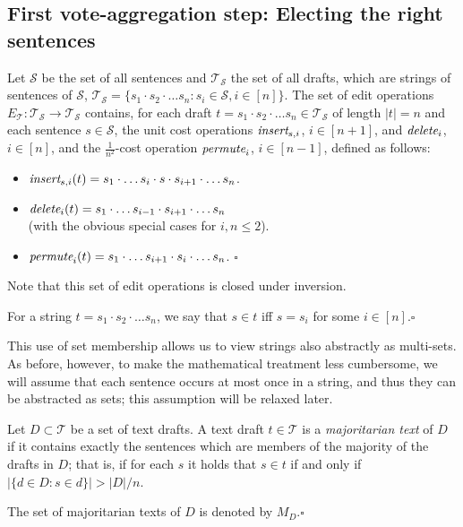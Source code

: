 \documentclass[sigconf]{aamas}  %
\newcommand{\qqed}{\hfill$\square$}
\newcommand{\calS}{\mathcal{S}}
\newcommand{\calT}{\mathcal{T}}
\newcommand{\iinsert}[1]{\emph{insert}_{#1}}
\newcommand{\ddelete}[1]{\emph{delete}_{#1}}
\newcommand{\permute}[1]{\emph{permute}_{#1}}
\begin{document}
\subsection{First vote-aggregation step: Electing the right sentences}

\begin{definition}
Let $\calS$ be the set of all sentences and $\calT_\calS$ the set of all drafts, which are strings of sentences of $\calS$,   
$\calT_\calS = \{s_1\cdot s_2 \cdot \ldots  s_n : s_i \in \calS, i \in [n]\}$. The set of edit operations $E_\calT: \calT_\calS \rightarrow \calT_\calS$ contains, for each draft $t = s_1\cdot s_2\cdot \ldots s_n \in \calT_\calS$ of length $|t|=n$ and each sentence $s \in \calS$, the unit cost operations $\iinsert{{s, i}}$, $i \in [n + 1]$, and $\ddelete{i}$, $i \in [n]$, and the $\frac{1}{n^2}$-cost operation $\permute{i}$, $i \in [n - 1]$, defined as follows:
%
\begin{itemize}

\item
$\iinsert{{s, i}}(t) = s_1\cdot \ldots s_i\cdot s\cdot s_{i + 1}\cdot \ldots s_n$.


\item
$\ddelete{i}(t) = s_1\cdot \ldots s_{i - 1}\cdot s_{i + 1}\cdot \ldots s_n$ \\
(with the obvious special cases for $i, n \le  2$).

\item
$\permute{i}(t) = s_1\cdot \ldots s_{i+1}\cdot s_i\cdot \ldots s_n$.
\qqed
\end{itemize}
%
\end{definition}

Note that this set of edit operations is closed under inversion.

\begin{definition}\label{definition:string-membership}
For a string $t = s_1\cdot s_2\cdot \ldots s_n$, we say that $s \in t$ iff $s = s_i$ for some $i \in [n]$.\qqed
\end{definition}

This use of set membership allows us to view strings also abstractly as multi-sets.  As before, however, to make the mathematical treatment less cumbersome, we will assume that each sentence occurs at most once in a string, and thus they can be abstracted as sets; this assumption will be relaxed later.

\begin{definition}\label{definition:majoritarian-drafts}
%
Let $D \subset \calT$ be a set of text drafts. A text draft $t \in \calT$ is a \emph{majoritarian text} of $D$ if it contains exactly the sentences which are members of the majority of the drafts in $D$; that is, if for each $s$ it holds that $s \in t$ if and only if $|\{d \in D : s \in d\}| > |D|/n$.

The set of majoritarian texts of $D$ is denoted by $M_D$.\qqed
%
\end{definition}
\end{document}

